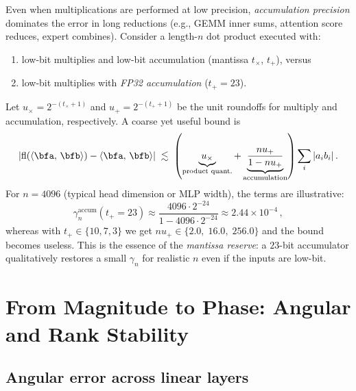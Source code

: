 \documentclass[11pt]{article}
\newcommand{\ip}[2]{\left\langle #1,\,#2 \right\rangle}
\theoremstyle{plain}
\theoremstyle{definition}
\begin{document}
Even when multiplications are performed at low precision, \emph{accumulation precision} dominates the error in long reductions (e.g., GEMM inner sums, attention score reduces, expert combines). Consider a length-$n$ dot product executed with:
\begin{enumerate}
  \item low-bit multiplies and low-bit accumulation (mantissa $t_\times$, $t_+$), versus
  \item low-bit multiplies with \emph{FP32 accumulation} ($t_+=23$).
\end{enumerate}
Let $u_\times=2^{-(t_\times+1)}$ and $u_+=2^{-(t_++1)}$ be the unit roundoffs for multiply and accumulation, respectively. A coarse yet useful bound is
\[
\left|\mathrm{fl}(\ip{\bfa}{\bfb}) - \ip{\bfa}{\bfb}\right|
\;\lesssim\;
\left(
\underbrace{u_\times}_{\text{product quant.}}
+
\underbrace{\frac{nu_+}{1-nu_+}}_{\text{accumulation}}
\right)\sum_i |a_i b_i|\,.
\]
For $n=4096$ (typical head dimension or MLP width), the terms are illustrative:
\[
\gamma_n^{\text{accum}}(t_+=23)\approx \frac{4096\cdot 2^{-24}}{1-4096\cdot 2^{-24}} \approx 2.44\times 10^{-4}\,,
\]
whereas with $t_+\in\{10,7,3\}$ we get $nu_+\in\{2.0,\;16.0,\;256.0\}$ and the bound becomes useless. This is the essence of the \emph{mantissa reserve}: a $23$-bit accumulator qualitatively restores a small $\gamma_n$ for realistic $n$ even if the inputs are low-bit.

\section{From Magnitude to Phase: Angular and Rank Stability}

\subsection{Angular error across linear layers}
\end{document}
